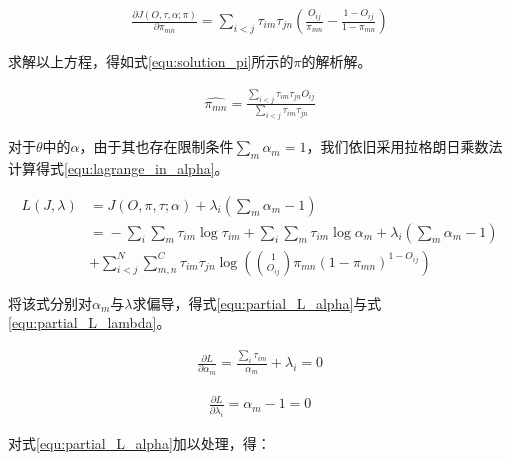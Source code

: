 \begin{equation}\label{equ:partial_J_pi}
  \begin{aligned}
\frac{\partial J(O,\tau,\alpha;\pi)}{\partial \pi_{mn}}=\sum_{i<j}\tau_{im}\tau_{jn}(\frac{O_{ij}}{\pi_{mn}}-\frac{1-O_{ij}}{1-\pi_{mn}})
\end{aligned}\end{equation}

求解以上方程，得如式\ref{equ:solution_pi}所示的$\pi$的解析解。

\begin{equation}\label{equ:solution_pi}
  \begin{aligned}
\hat{\pi_{mn}}=\frac{\sum_{i<j}\tau_{im}\tau_{jn}O_{ij}}{\sum_{i<j}\tau_{im}\tau_{jn}}
\end{aligned}\end{equation}

对于$\theta$中的$\alpha$，由于其也存在限制条件$\sum_m \alpha_m=1$，我们依旧采用拉格朗日乘数法计算得式\ref{equ:lagrange_in_alpha}。

\begin{equation}\label{equ:lagrange_in_alpha}
  \begin{aligned}
L(J,\lambda)&={}J(O,\pi,\tau;\alpha)+\lambda_i(\sum_m \alpha_{m}-1)\\
&={}-\sum_i\sum_m\tau_{im} \log \tau_{im} +\sum_i\sum_m \tau_{im} \log \alpha_m+\lambda_i(\sum_m \alpha_{m}-1)\\ &+\sum_{i<j}^N\sum_{m,n}^C\tau_{im}\tau_{jn}\log ( \binom{1}{O_{ij}}\pi_{mn}(1-\pi_{mn})^{1-O_{ij}})
\end{aligned}\end{equation}

将该式分别对$\alpha_{m}$与$\lambda$求偏导，得式\ref{equ:partial_L_alpha}与式\ref{equ:partial_L_lambda}。

\begin{equation}\label{equ:partial_L_alpha}
  \begin{aligned}
\frac{\partial L}{\partial \alpha_m}=\frac{\sum_i\tau_{im}}{\alpha_m}+\lambda_i=0
\end{aligned}\end{equation}

\begin{equation}\label{equ:partial_L_lambda}
  \begin{aligned}
\frac{\partial L}{\partial \lambda_i}=\alpha_{m}-1=0
\end{aligned}\end{equation}

对式\ref{equ:partial_L_alpha}加以处理，得：

